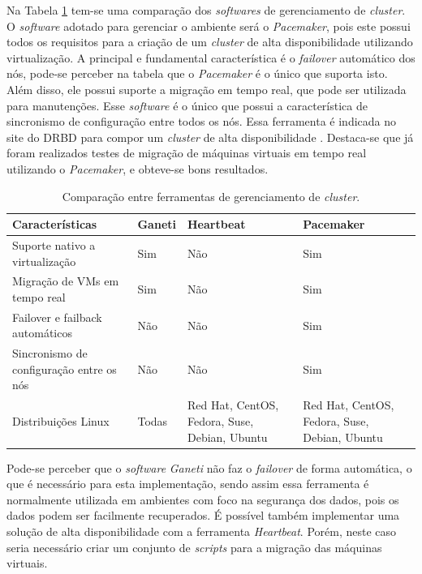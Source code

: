 Na Tabela \ref{tab:clusterger} tem-se uma comparação dos \textit{softwares} de gerenciamento de \textit{cluster}. 
O \textit{software} adotado para gerenciar o ambiente será o \textit{Pacemaker}, pois este possui todos os requisitos para a criação de um 
\textit{cluster} de alta disponibilidade utilizando virtualização. A principal e fundamental característica é o \textit{failover} automático
dos nós, pode-se perceber na tabela que o \textit{Pacemaker} é o único que suporta isto. Além disso, ele possui suporte a migração em tempo real, 
que pode ser utilizada para manutenções. Esse \textit{software} é o único que possui a característica de sincronismo de configuração entre todos 
os nós. Essa ferramenta é indicada no site do \ac{DRBD} para compor um \textit{cluster} de alta disponibilidade \cite{drbd}.
Destaca-se que já foram realizados testes de migração de máquinas virtuais em tempo real utilizando o \textit{Pacemaker}, e obteve-se 
bons resultados.

\begin{table}[h!]
\caption{Comparação entre ferramentas de gerenciamento de \textit{cluster}.}
\label{tab:clusterger}
\begin{center}
\begin{tabular}{|p{4cm}|p{2cm}|p{3.5cm}|p{3.5cm}|}\hline
\textbf{Características} & \textbf{Ganeti} & \textbf{Heartbeat} & \textbf{Pacemaker} \\\hline
Suporte nativo a virtualização & Sim & Não & Sim \\\hline
Migração de \acp{VM} em tempo real & Sim & Não & Sim \\\hline
Failover e failback automáticos & Não & Não & Sim \\\hline
Sincronismo de configuração entre os nós & Não & Não & Sim \\\hline
Distribuições Linux & Todas & Red Hat, CentOS, Fedora, Suse, Debian, Ubuntu & Red Hat, CentOS, Fedora, Suse, Debian, Ubuntu \\\hline
\end{tabular}
\end{center}
\end{table}

Pode-se perceber que o \textit{software} \textit{Ganeti} não faz o \textit{failover} de forma automática, o que é necessário para esta 
implementação, sendo assim essa ferramenta é normalmente utilizada em ambientes com foco na segurança dos dados, pois os dados podem ser 
facilmente recuperados.
É possível também implementar uma solução de alta disponibilidade com a ferramenta \textit{Heartbeat}. Porém, neste caso seria necessário criar 
um conjunto de \textit{scripts} para a migração das máquinas virtuais.

